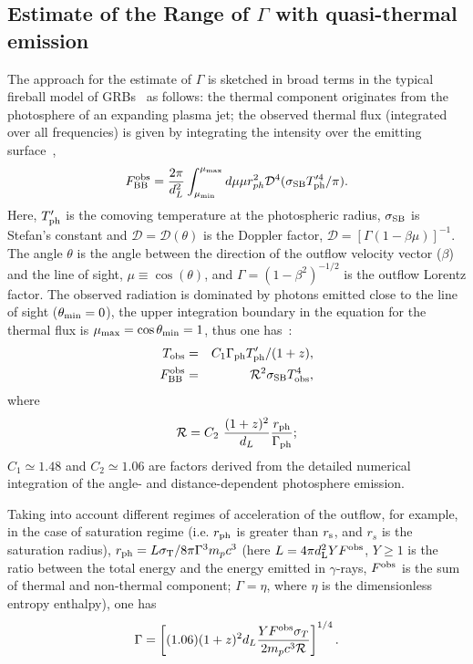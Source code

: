 \documentclass[prd,twocolumn,amsmath,amssymb,aps,linenumbers]{revtex4-2} %
\newcommand{\D}{{\mathcal {D}}}
\newcommand{\R}{{\mathcal {R}}}
\providecommand{\DIFaddtex}[1]{{\protect\color{blue} \sf #1}} %
\providecommand{\DIFdeltex}[1]{{\protect\color{red} \scriptsize #1}} %
\providecommand{\DIFaddbegin}{} %
\providecommand{\DIFaddend}{} %
\providecommand{\DIFdelbegin}{} %
\providecommand{\DIFdelend}{} %
\providecommand{\DIFadd}[1]{\texorpdfstring{\DIFaddtex{#1}}{#1}} %
\providecommand{\DIFdel}[1]{\texorpdfstring{\DIFdeltex{#1}}{}} %
\newcommand{\DIFscaledelfig}{0.5}
\newlength{\DIFdelgraphicswidth} %
\newlength{\DIFdelgraphicsheight} %
\newcommand{\DIFaddincludegraphics}[2][]{{\color{blue}\fbox{\DIFOincludegraphics[#1]{#2}}}} %
\newcommand{\DIFdelincludegraphics}[2][]{%
\sbox{\DIFdelgraphicsbox}{\DIFOincludegraphics[#1]{#2}}%
\settoboxwidth{\DIFdelgraphicswidth}{\DIFdelgraphicsbox} %
\settoboxtotalheight{\DIFdelgraphicsheight}{\DIFdelgraphicsbox} %
\scalebox{\DIFscaledelfig}{%
\parbox[b]{\DIFdelgraphicswidth}{\usebox{\DIFdelgraphicsbox}\\[-\baselineskip] \rule{\DIFdelgraphicswidth}{0em}}\llap{\resizebox{\DIFdelgraphicswidth}{\DIFdelgraphicsheight}{%
\setlength{\unitlength}{\DIFdelgraphicswidth}%
\begin{picture}(1,1)%
\thicklines\linethickness{2pt} %
{\color[rgb]{1,0,0}\put(0,0){\framebox(1,1){}}}%
{\color[rgb]{1,0,0}\put(0,0){\line( 1,1){1}}}%
{\color[rgb]{1,0,0}\put(0,1){\line(1,-1){1}}}%
\end{picture}%
}\hspace*{3pt}}} %
} %
\DeclareRobustCommand{\DIFaddbegin}{\DIFOaddbegin \let\includegraphics\DIFaddincludegraphics} %
\DeclareRobustCommand{\DIFaddend}{\DIFOaddend \let\includegraphics\DIFOincludegraphics} %
\DeclareRobustCommand{\DIFdelbegin}{\DIFOdelbegin \let\includegraphics\DIFdelincludegraphics} %
\DeclareRobustCommand{\DIFdelend}{\DIFOaddend \let\includegraphics\DIFOincludegraphics} %
\begin{document}
\subsection{Estimate of the Range of $\Gamma$ with quasi-thermal emission}
The approach for the estimate of $\Gamma$ is sketched in broad terms in the typical fireball model of GRBs~\citep[e.g.][]{1986ApJ...308L..47G,1986ApJ...308L..43P} as follows: the thermal component originates from the photosphere of an
expanding plasma jet; the observed thermal flux (integrated over
all frequencies) is given by integrating the intensity over the
emitting \DIFaddbegin \DIFadd{surface}\DIFaddend ~\citep{2007ApJ...664L...1P},
\begin{equation}\label{eq:Fobs_BB}
  F^{\rm obs}_{\rm BB} = \frac{2\pi}{d_L^2} \int^{\mu_{\rm max}}_{\mu_{\rm min}} d\mu \mu
r_{ph}^2 \D^4 (\sigma_{\rm SB} T'^4_{\rm ph} / \pi).  
\end{equation}
 Here, $T'_{\rm ph}$ is the comoving
temperature at the photospheric radius, $\sigma_{\rm SB}$ is Stefan's
constant and $\D = \D(\theta)$ is the Doppler factor, $\D =
[\Gamma(1-\beta \mu)]^{-1}$. The angle $\theta$ is the angle
between the direction of the outflow velocity vector ($\beta$) and
the line of sight, $\mu \equiv \cos(\theta)$, and $\Gamma = (1-
\beta^2)^{-1/2}$ is the outflow Lorentz factor.  
The observed radiation is dominated by photons
emitted close to the line of sight ($\theta_{\rm min}=0$), the upper integration
boundary in the equation for the thermal flux is $\mu_{\rm max}=\cos \theta_{\rm min}=1$, thus one has~\citep{2007ApJ...664L...1P, 2015ApJ...801..103G}:
\begin{eqnarray}
T_{\rm obs}& = & C_1\Gamma_{\rm ph} T'_{\rm ph} /(1+z),\\
F^{\rm obs}_{\rm BB} & = & \mathcal{R}^2\sigma_{\rm SB} T_{\rm obs}^4,
\end{eqnarray}
where
\begin{eqnarray}
\mathcal{R}=C_2~\frac{(1+z)^2}{d_L}\frac{r_{\rm ph}}{\Gamma_{\rm ph}};
\end{eqnarray}
 $C_1 \simeq 1.48$ and $C_2 \simeq 1.06$ are factors derived from the detailed numerical integration of the angle- and distance-dependent photosphere emission. 


Taking into account different regimes of acceleration of the outflow, for example, in the case of saturation regime (i.e. $r_{\rm ph}$ is greater than $r_{\rm s}$, and $r_s$ is the saturation radius), $r_{\rm ph}=L\sigma_{\rm T}/8\pi \Gamma^3 m_p c^3$ (here $L=4\pi d^2_{\rm L }Y F^{\rm obs}$, $Y\geq 1$ is the ratio between the total energy and the energy emitted in $\gamma$-rays, $F^{\rm obs}$ is the sum of thermal and non-thermal component; $\Gamma=\eta$, where $\eta$ is the dimensionless \DIFdelbegin \DIFdel{entropy}\DIFdelend \DIFaddbegin \DIFadd{enthalpy}\DIFaddend ), one has
\begin{equation}
    \Gamma = \left[(1.06) { (1+z)^2 d_L} {Y F^{\rm obs} \sigma_T \over 2 m_p
    c^3 \R} \right]^{1/4}.
\label{eq:eta}
\end{equation}
\end{document}
